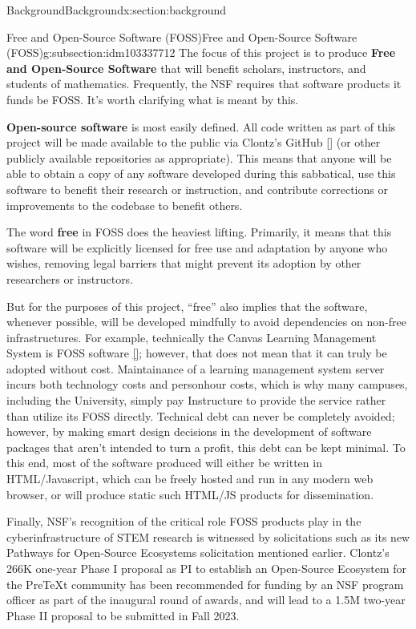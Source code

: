 \documentclass[oneside,10pt,]{article}
\newcommand{\xreffont}{\relax}
\newcommand{\terminology}[1]{\textbf{#1}}
\begin{document}
\begin{sectionptx}{Background}{}{Background}{}{}{x:section:background}
\begin{subsectionptx}{Free and Open-Source Software (FOSS)}{}{Free and Open-Source Software (FOSS)}{}{}{g:subsection:idm103337712}
The focus of this project is to produce \terminology{Free and Open-Source Software} that will benefit scholars, instructors, and students of mathematics. Frequently, the NSF requires that software products it funds be FOSS. It's worth clarifying what is meant by this.%
\par
\terminology{Open-source software} is most easily defined. All code written as part of this project will be made available to the public via Clontz's GitHub \hyperlink{x:biblio:biblio-ghclontz}{[{\xreffont 9}]} (or other publicly available repositories as appropriate). This means that anyone will be able to obtain a copy of any software developed during this sabbatical, use this software to benefit their research or instruction, and contribute corrections or improvements to the codebase to benefit others.%
\par
The word \terminology{free} in FOSS does the heaviest lifting. Primarily, it means that this software will be explicitly licensed for free use and adaptation by anyone who wishes, removing legal barriers that might prevent its adoption by other researchers or instructors.%
\par
But for the purposes of this project, ``free'' also implies that the software, whenever possible, will be developed mindfully to avoid dependencies on non-free infrastructures. For example, technically the Canvas Learning Management System is FOSS software \hyperlink{x:biblio:biblio-canvas}{[{\xreffont 16}]}; however, that does not mean that it can truly be adopted without cost. Maintainance of a learning management system server incurs both technology costs and personhour costs, which is why many campuses, including the University, simply pay Instructure to provide the service rather than utilize its FOSS directly. Technical debt can never be completely avoided; however, by making smart design decisions in the development of software packages that aren't intended to turn a profit, this debt can be kept minimal. To this end, most of the software produced will either be written in HTML\slash{}Javascript, which can be freely hosted and run in any modern web browser, or will produce static such HTML\slash{}JS products for dissemination.%
\par
Finally, NSF's recognition of the critical role FOSS products play in the cyberinfrastructure of STEM research is witnessed by solicitations such as its new Pathways for Open-Source Ecosystems solicitation mentioned earlier. Clontz's \textdollar{}266K one-year Phase I proposal as PI to establish an Open-Source Ecosystem for the PreTeXt community has been recommended for funding by an NSF program officer as part of the inaugural round of awards, and will lead to a \textdollar{}1.5M two-year Phase II proposal to be submitted in Fall 2023.%
\end{subsectionptx}
\end{sectionptx}
\end{document}
